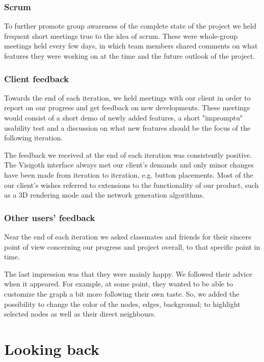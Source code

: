 \documentclass[a4paper,11pt,titlepage]{article}
\let\stdsection\section         %
\renewcommand{\section}{\newpage\stdsection}
\begin{document}
\subsubsection{Scrum}
To further promote group awareness of the complete state of the
project we held frequent short meetings true to the idea of scrum.
These were whole-group meetings held every few days, in which team
members shared comments on what features they were working on at
the time and the future outlook of the project.

\subsubsection{Client feedback}
Towards the end of each iteration, we held meetings with our client
in order to report on our progress and get feedback on new
developments. These meetings would consist of a short demo of newly
added features, a short "impromptu" usability test and a discussion
on what new features should be the focus of the following iteration.

The feedback we received at the end of each iteration was
consistently positive. The Visigoth interface always met our
client's demands and only minor changes have been made from
iteration to iteration, e.g. button placements. Most of the our
client's wishes referred to extensions to the functionality of
our product, such as a 3D rendering mode and the network generation
algorithms.


\subsubsection{Other users' feedback}
Near the end of each iteration we asked classmates and friends for their
sincere point of view concerning our progress and project overall, to that
specific point in time.

The last impression was that they were mainly happy. We followed their advice 
when it appeared. For example, at some point, they wanted to be able to 
customize the graph a bit more following their own taste. So, we added the 
possibility to change the color of the nodes, edges, background; to highlight 
selected nodes as well as their direct neighbours.



\section{Looking back}
\end{document}

